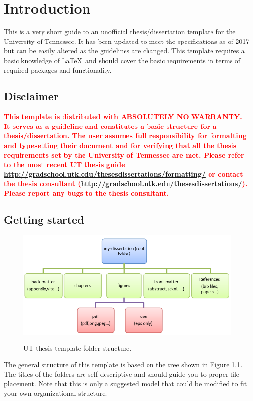 \chapter{Introduction} \label{ch:introduction}

This is a very short guide to an unofficial thesis/dissertation template for the University of Tennessee. It has been updated to meet the specifications as of 2017 but can be easily altered as the guidelines are changed. This template requires a basic knowledge of \LaTeX\ and should cover the basic requirements in terms of required packages and functionality.

\section{Disclaimer}
\textcolor{red}{\bf
This template is distributed with ABSOLUTELY NO WARRANTY. It serves as a guideline and constitutes a basic structure for a thesis/dissertation. The user assumes full responsibility for formatting and typesetting their document and for verifying that all the thesis requirements set by the University of Tennessee are met. Please refer to the most recent UT thesis guide \href{http://gradschool.utk.edu/thesesdissertations/formatting/}{http://gradschool.utk.edu/thesesdissertations/formatting/} or contact the thesis consultant (\href{http://gradschool.utk.edu/thesesdissertations/}{http://gradschool.utk.edu/thesesdissertations/}). Please report any bugs to the thesis consultant.}

\section{Getting started}
\begin{figure}[h]
  \centering
  \includegraphics[width=6.5in]{fig01-folder-structure}\\
  \caption{UT thesis template folder structure.}\label{fig:intro-folder-structure}
\end{figure}
The general structure of this template is based on the tree shown in Figure \ref{fig:intro-folder-structure}. The titles of the folders are self descriptive and should guide you to proper file placement. Note that this is only a suggested model that could be modified to fit your own organizational structure.

